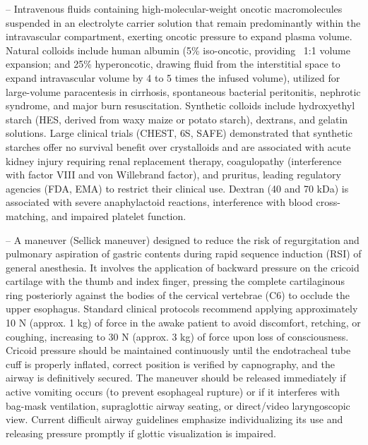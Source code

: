 -- Intravenous fluids containing high-molecular-weight oncotic macromolecules suspended in an electrolyte carrier solution that remain predominantly within the intravascular compartment, exerting oncotic pressure to expand plasma volume. Natural colloids include human albumin (5\% iso-oncotic, providing ~1:1 volume expansion; and 25\% hyperoncotic, drawing fluid from the interstitial space to expand intravascular volume by 4 to 5 times the infused volume), utilized for large-volume paracentesis in cirrhosis, spontaneous bacterial peritonitis, nephrotic syndrome, and major burn resuscitation. Synthetic colloids include hydroxyethyl starch (HES, derived from waxy maize or potato starch), dextrans, and gelatin solutions. Large clinical trials (CHEST, 6S, SAFE) demonstrated that synthetic starches offer no survival benefit over crystalloids and are associated with acute kidney injury requiring renal replacement therapy, coagulopathy (interference with factor VIII and von Willebrand factor), and pruritus, leading regulatory agencies (FDA, EMA) to restrict their clinical use. Dextran (40 and 70 kDa) is associated with severe anaphylactoid reactions, interference with blood cross-matching, and impaired platelet function.

-- A maneuver (Sellick maneuver) designed to reduce the risk of regurgitation and pulmonary aspiration of gastric contents during rapid sequence induction (RSI) of general anesthesia. It involves the application of backward pressure on the cricoid cartilage with the thumb and index finger, pressing the complete cartilaginous ring posteriorly against the bodies of the cervical vertebrae (C6) to occlude the upper esophagus. Standard clinical protocols recommend applying approximately 10 N (approx. 1 kg) of force in the awake patient to avoid discomfort, retching, or coughing, increasing to 30 N (approx. 3 kg) of force upon loss of consciousness. Cricoid pressure should be maintained continuously until the endotracheal tube cuff is properly inflated, correct position is verified by capnography, and the airway is definitively secured. The maneuver should be released immediately if active vomiting occurs (to prevent esophageal rupture) or if it interferes with bag-mask ventilation, supraglottic airway seating, or direct/video laryngoscopic view. Current difficult airway guidelines emphasize individualizing its use and releasing pressure promptly if glottic visualization is impaired.

